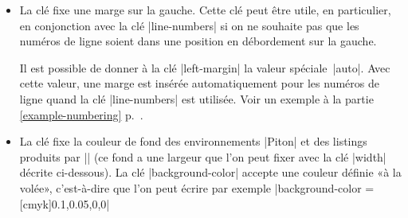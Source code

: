 \documentclass[dvipsnames,svgnames]{article}
\begin{document}
\begin{itemize}
\begin{itemize}
\item La clé  reprend la numérotation là où elle avait été
laissée au dernier listing. En fait, la clé |line-numbers/resume| a un alias, qui est
|resume| tout court (car on peut être amené à l'utiliser souvent).

\item La clé  impose que la numérotation commence à ce
numéro.

\item La clé  est la distance horizontale entre les numéros
de lignes (insérés par |line-numbers|) et les lignes du code informatique. La valeur
initiale est 0.7~em.

\item La clé  est une liste de tokens qui est insérée
avant le numéro de ligne pour le formater. Il est possible de mettre \emph{en dernière
  position} de cette liste une commande LaTeX à un argument comme |\fbox|.

La valeur initiale est |\footnotesize \color{gray}|.
\end{itemize}

Pour la commodité, un dispositif de factorisation du préfixe |line-numbers| est
disponible, c'est-à-dire que l'on peut écrire :

\begin{Verbatim}
\PitonOptions
  {
    line-numbers = 
      { 
        skip-empty-lines = false ,
        label-empty-lines = false ,
        sep = 1 em ,
        format = \footnotesize \color{blue}
      }
  }
\end{Verbatim}


\item {} La clé  fixe une marge sur la gauche.
Cette clé peut être utile, en particulier, en conjonction avec la clé |line-numbers| si on
ne souhaite pas que les numéros de ligne soient dans une position en débordement sur la
gauche.

Il est possible de donner à la clé |left-margin| la valeur spéciale~|auto|. Avec cette
valeur, une marge est insérée automatiquement pour les numéros de ligne quand la clé
|line-numbers| est utilisée. Voir un exemple à la partie \ref{example-numbering}
p.~\pageref{example-numbering}.

\item {} La clé  fixe la couleur de
fond des environnements |{Piton}| et des listings produits par |\PitonInputFile| (ce fond
a une largeur que l'on peut fixer avec la clé |width| décrite ci-dessous). La clé
|background-color| accepte une couleur définie «à la volée», c'est-à-dire que l'on peut
écrire par exemple |background-color = [cmyk]{0.1,0.05,0,0}|


\end{itemize}
\end{document}
